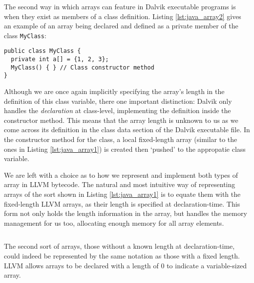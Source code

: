 The second way in which arrays can feature in Dalvik executable programs is when they exist as members of a class definition. Listing \ref{lst:java_array2} gives an example of an array being declared and defined as a private member of the class \verb|MyClass|:

\begin{lstlisting}[frame=single, caption={Arrays as class members in Java}, label={lst:java_array2}]
public class MyClass {
  private int a[] = {1, 2, 3};
  MyClass() { } // Class constructor method
}
\end{lstlisting}

Although we are once again implicitly specifying the array's length in the definition of this class variable, there one important distinction: Dalvik only handles the \textit{declaration} at class-level, implementing the definition inside the constructor method. This means that the array length is unknown to us as we come across its definition in the class data section of the Dalvik executable file. In the constructor method for the class, a local fixed-length array (similar to the ones in Listing \ref{lst:java_array1}) is created then `pushed' to the appropatie class variable.

We are left with a choice as to how we represent and implement both types of array in LLVM bytecode. The natural and most intuitive way of representing arrays of the sort shown in Listing \ref{lst:java_array1} is to equate them with the fixed-length LLVM arrays, as their length is specified at declaration-time. This form not only holds the length information in the array, but handles the memory management for us too, allocating enough memory for all array elements.

\lstset{
	language=Assembly,
	basicstyle=\small,
	stringstyle=\ttfamily
}

\begin{lstlisting}[frame=single, caption={LLVM fixed-length array}, label=lst:llvm_fix]
%a = [3 x i32]
\end{lstlisting}

The second sort of arrays, those without a known length at declaration-time, could indeed be represented by the same notation as those with a fixed length. LLVM allows arrays to be declared with a length of 0 to indicate a variable-sized array.

\begin{lstlisting}[frame=single, caption={LLVM variable-length array}, label=lst:llvm_var]
%a = [0 x i32]
\end{lstlisting}

